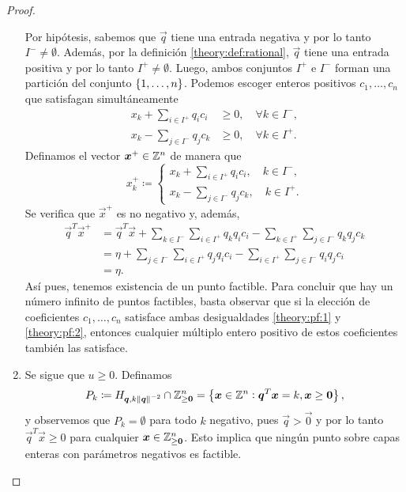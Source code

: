 \begin{proof}
\begin{enumerate}
			Por hipótesis, sabemos que $\vec{q}$ tiene una entrada negativa y por lo tanto $I^- \neq
			\emptyset$. Además, por la definición \ref{theory:def:rational}, $\vec{q}$ tiene una
			entrada positiva y por lo tanto $I^+ \neq \emptyset$. Luego, ambos conjuntos $I^+$ e
			$I^-$ forman una partición del conjunto $\lbrace 1, \ldots, n \rbrace$. Podemos escoger
			enteros positivos $c_1, \ldots, c_n$ que satisfagan simultáneamente
			\begin{align}
				x_k + \sum_{i \in I^+}q_ic_i &\geq 0, \quad \forall k \in I^-,
				\label{theory:pf:1} \\
				x_k - \sum_{j \in I^-}q_jc_k &\geq 0, \quad \forall k \in I^+.
				\label{theory:pf:2}
			\end{align}
			Definamos el vector $\boldsymbol{x}^+ \in \mathbb{Z}^n$ de manera que
			\begin{equation*}
				x^+_k \coloneq \begin{cases}
					x_k + \sum_{i \in I^+}q_ic_i, \quad k \in I^-, \\
					x_k - \sum_{j \in I^-}q_jc_k, \quad k \in I^+.
				\end{cases}
			\end{equation*}
			Se verifica que $\vec{x}^+$ es no negativo y, además,
			\begin{align*}
				\vec{q}^T\vec{x}^+
				&= \vec{q}^T\vec{x}
				+ \sum_{k \in I^-}\sum_{i \in I^+}q_kq_ic_i
				- \sum_{k \in I^+}\sum_{j \in I^-}q_kq_jc_k \\
				&= \eta
				+ \sum_{j \in I^-}\sum_{i \in I^+}q_jq_ic_i
				- \sum_{i \in I^+}\sum_{j \in I^-}q_iq_jc_i \\
				&= \eta.
			\end{align*}
			Así pues, tenemos existencia de un punto factible. Para concluir que hay un número
			infinito de puntos factibles, basta observar que si la elección de coeficientes $c_1,
			\ldots, c_n$ satisface ambas desigualdades \eqref{theory:pf:1} y \eqref{theory:pf:2},
			entonces cualquier múltiplo entero positivo de estos coeficientes también las satisface.
		\item Se sigue que $u \geq 0$. Definamos
			\begin{equation}
				\label{theory:pf:p_k}
				P_k \coloneq H_{\boldsymbol{q}, k\left\lVert \boldsymbol{q} \right\rVert^{-2}} \cap \mathbb{Z}_{\geq \boldsymbol{0}}^n
				= \left\lbrace \boldsymbol{x} \in \mathbb{Z}^n \vcentcolon \boldsymbol{q}^T\boldsymbol{x} = k,
					\boldsymbol{x} \geq \boldsymbol{0} \right\rbrace,
			\end{equation}
			y observemos que $P_k = \emptyset$ para todo $k$ negativo, pues $\vec{q} > \vec{0}$ y por
			lo tanto $\vec{q}^T\vec{x} \geq 0$ para cualquier $\boldsymbol{x} \in \mathbb{Z}^n_{\geq \boldsymbol{0}}$. Esto implica que
			ningún punto sobre capas enteras con parámetros negativos es factible.


\end{enumerate}
\end{proof}
